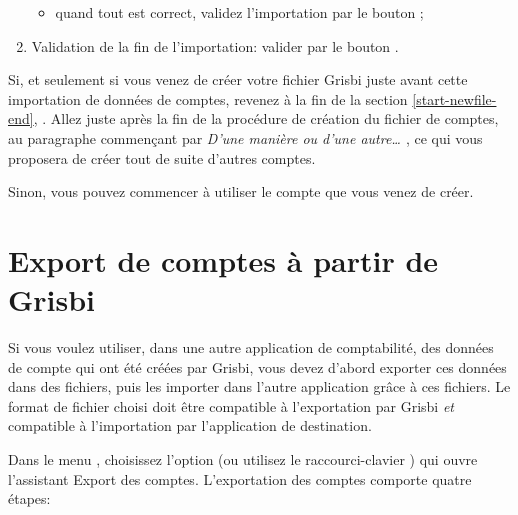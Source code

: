 \begin{enumerate}
\begin{itemize}
			\item quand tout est correct, validez l'importation par le bouton ;
		\end{itemize}
	\item Validation de la fin de l'importation: valider par le bouton .
\end{enumerate}

Si, et seulement si vous venez de créer votre fichier Grisbi juste avant cette importation de données de comptes, revenez à la fin de la section \vref{start-newfile-end}, . Allez juste après la fin de la procédure de création du fichier de comptes, au paragraphe commençant par \emph{D'une manière ou d'une autre\ldots{ }}, ce qui vous proposera de créer tout de suite d'autres comptes.

Sinon, vous pouvez commencer à utiliser le compte que vous venez de créer.


\section{Export de comptes à partir de Grisbi\label{move-export}}


Si vous voulez utiliser, dans une autre application de comptabilité, des données de compte qui ont été créées par Grisbi, vous devez d'abord exporter ces données dans des fichiers, puis les importer dans l'autre application grâce à ces fichiers. Le format de fichier choisi doit être compatible à l'exportation par Grisbi \emph{et} compatible à l'importation par l'application de destination.
 
Dans le menu , choisissez l'option   (ou utilisez le raccourci-clavier ) qui ouvre l'assistant Export des comptes. L'exportation des comptes comporte quatre étapes:

